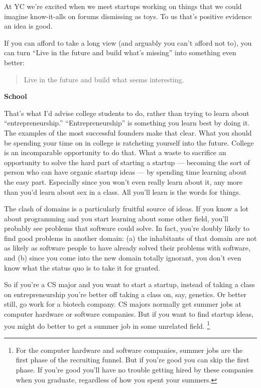 \documentclass[12pt]{book}
\begin{document}
At YC we're excited when we meet startups working on things that we
could imagine know-it-alls on forums dismissing as toys. To us that's
positive evidence an idea is good.

If you can afford to take a long view (and arguably you can't afford not
to), you can turn ``Live in the future and build what's missing'' into
something even better:

\begin{quote}
Live in the future and build what seems interesting.
\end{quote}

\textbf{School}

That's what I'd advise college students to do, rather than trying to
learn about ``entrepreneurship.'' ``Entrepreneurship'' is something you
learn best by doing it. The examples of the most successful founders
make that clear. What you should be spending your time on in college is
ratcheting yourself into the future. College is an incomparable
opportunity to do that. What a waste to sacrifice an opportunity to
solve the hard part of starting a startup --- becoming the sort of
person who can have organic startup ideas --- by spending time learning
about the easy part. Especially since you won't even really learn about
it, any more than you'd learn about sex in a class. All you'll learn is
the words for things.

The clash of domains is a particularly fruitful source of ideas. If you
know a lot about programming and you start learning about some other
field, you'll probably see problems that software could solve. In fact,
you're doubly likely to find good problems in another domain: (a) the
inhabitants of that domain are not as likely as software people to have
already solved their problems with software, and (b) since you come into
the new domain totally ignorant, you don't even know what the status quo
is to take it for granted.

So if you're a CS major and you want to start a startup, instead of
taking a class on entrepreneurship you're better off taking a class on,
say, genetics. Or better still, go work for a biotech company. CS majors
normally get summer jobs at computer hardware or software companies. But
if you want to find startup ideas, you might do better to get a summer
job in some unrelated field. \footnote{For the computer hardware and software companies, summer jobs
are the first phase of the recruiting funnel. But if you're good you can
skip the first phase. If you're good you'll have no trouble getting
hired by these companies when you graduate, regardless of how you spent
your summers.}
\end{document}
